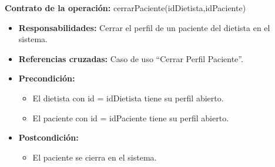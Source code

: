 \textbf{Contrato de la operación:} cerrarPaciente(idDietista,idPaciente)
\begin{itemize}
\item \textbf{Responsabilidades:} Cerrar el perfil de un paciente del dietista en el sistema.
\item \textbf{Referencias cruzadas:} Caso de uso ``Cerrar Perfil Paciente''.
\item \textbf{Precondición:}
\begin{itemize}
\item El dietista con id = idDietista tiene su perfil abierto.
\item El paciente con id = idPaciente tiene su perfil abierto.
\end{itemize}
\item \textbf{Postcondición:}
\begin{itemize}
\item El paciente se cierra en el sistema.
\end{itemize}
\end{itemize}



